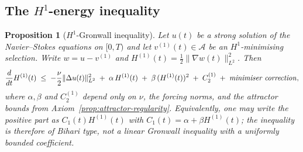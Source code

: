 \documentclass[12pt,a4paper]{article}
\theoremstyle{definition}
\theoremstyle{plain}
\newtheorem{proposition}[definition]{Proposition}
\theoremstyle{remark}
\begin{document}
\subsection{The \texorpdfstring{$H^1$}{H1}-energy inequality}

\begin{proposition}[$H^1$-Gronwall inequality]\label{prop:H1-Gronwall}
Let $u(t)$ be a strong solution of the Navier--Stokes equations
on $[0,T)$ and let $v^{(1)}(t) \in \mathcal{A}$ be an $H^1$-minimising
selection.  Write $w = u - v^{(1)}$ and
$H^{(1)}(t) = \tfrac{1}{2}\|\nabla w(t)\|_{L^2}^2$.  Then
\begin{equation}\label{eq:H1-ineq}
  \frac{d}{dt}H^{(1)}(t)
  \;\le\;
  -\frac{\nu}{2}\|\Delta u(t)\|_{L^2}^2
  \;+\; \alpha\,H^{(1)}(t)
  \;+\; \beta\,(H^{(1)}(t))^2
  \;+\; C_2^{(1)}
  \;+\; \text{\emph{minimiser correction}},
\end{equation}
where $\alpha,\beta$ and $C_2^{(1)}$ depend only on $\nu$, the forcing
norms, and the attractor bounds from Axiom~\ref{prop:attractor-regularity}.
Equivalently, one may write the positive part as
$C_1(t)H^{(1)}(t)$ with $C_1(t)=\alpha+\beta H^{(1)}(t)$; the inequality is
therefore of Bihari type, not a linear Gronwall inequality with a uniformly
bounded coefficient.
\end{proposition}
\end{document}
